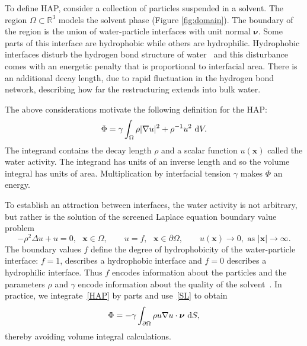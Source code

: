 To define HAP, consider a collection of particles suspended in a
solvent. The region $\Omega \subset \mathbb{R}^3$ models the solvent
phase (Figure \ref{fig:domain}).
The boundary of the region is the union of water-particle interfaces
with unit normal $\boldsymbol{\nu}$. Some parts of this interface are
hydrophobic while others are hydrophilic. Hydrophobic interfaces disturb
the hydrogen bond structure of water~\cite{Luzar1987, Jonsson2006,
Varilly2011} and this disturbance comes with an energetic penalty that
is proportional to interfacial area. There is an additional decay
length, due to rapid fluctuation in the hydrogen bond network,
describing how far the restructuring extends into bulk water.

The above considerations motivate the following definition for the HAP:
\begin{align}
\label{HAP}
  \Phi = \gamma \int_{\Omega} \rho |\nabla u|^2 + \rho^{-1}u^2 \,\dif V. 
\end{align}
The integrand contains
the decay length $\rho$
and a scalar function $u(\mathbf{x})$ called the water activity.
The integrand has units of an inverse length and so
the volume integral has units of area. Multiplication by interfacial tension
$\gamma$ makes $\Phi$ an energy. 

To establish an attraction between interfaces, the water activity is not
arbitrary, but rather is the solution of the screened Laplace
equation boundary value problem 
\begin{equation}
  \label{SL}
  -\rho^2 \Delta u + u = 0, \mbox{ } \mathbf{x} \in \Omega, \qquad
  u = f,  \mbox{ } \mathbf{x} \in \partial \Omega, \qquad 
  u(\mathbf{x}) \to 0, \mbox{ as } |\mathbf{x}| \to \infty.
\end{equation}
The boundary values $f$ define the degree of hydrophobicity of the
water-particle interface: $f=1$, describes a hydrophobic interface and
$f=0$ describes a hydrophilic interface. Thus $f$ encodes information
about the particles and the parameters $\rho$ and $\gamma$ encode
information about the quality of the solvent~\cite{Israelachvili1954,
Discher2002}. In practice, we integrate~\eqref{HAP} by parts and
use~\eqref{SL} to obtain
\begin{equation}
\label{eq:HAP_easy}
\Phi = -\gamma \int_{\partial \Omega} \rho u \nabla u \cdot \boldsymbol{\nu} \,\dif S,
\end{equation}
thereby avoiding volume integral calculations.

